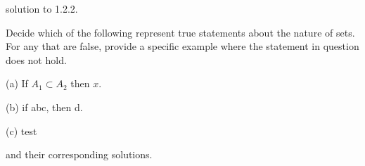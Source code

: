 \documentclass[../analysis_sols.tex]{subfiles}
\begin{document}
\begin{solution}
    solution to 1.2.2.
\end{solution}




\begin{exercise}
    Decide which of the following represent true statements about the nature of sets. For any that are false, provide a specific example where the statement in question does not hold.

    (a) If \( A_{1} \subset A_{2} \) then \( x \).

    (b) if abc, then d.     

    (c) test
\end{exercise}

\begin{solution}
    and their corresponding solutions.
\end{solution}
\end{document}
